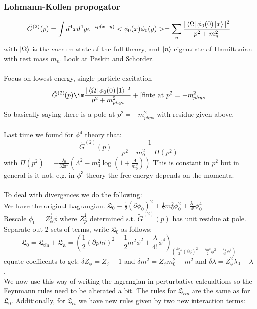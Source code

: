 \documentclass{article}
\begin{document}
\subsubsection{Lohmann-Kollen propogator}
$$
\tilde G^{(2)}(p) = \int d^4 x d^4 y e^{-ip(x-y)} < \phi_0 (x) \phi_0 (y)> = \sum_n \frac{|\bra{\Omega} \phi_0(0) \ket{x} |^2}{p^2 + m_n^2}
$$
with $\ket{\Omega}$ is the vaccum state of the full theory, and $\ket{n}$ eigenstate of Hamiltonian with rest mass $m_n$. Look at Peskin and Schorder. \\\\
Focus on lowest energy, single particle excitation\\
$$\tilde G^{(2)}(p) \im \frac{|\bra{\Omega} \phi_0(0) \ket{1} |^2}{p^2 + m^2_{phys}} + [\text{finte at } p^2 = - m^2_{phys}$$
So basically saying there is a pole at $p^2 = - m^2_{phys}$ with residue given above.\\\\
Last time we found for $\phi^4$ theory that:
$$
\tilde G^{(2)}(p) = \frac{1}{p^2 - m_0^2 - \Pi(p^2)}
$$
with $\Pi(p^2) = - \frac{\lambda_0}{32 \pi^2} ( \Lambda^2 - m_0^2 \log ( 1 + \frac{\Lambda}{m_0^2}))$
This is constant in $p^2$ but in general is it not. e.g. in $\phi^3$ theory the free energy depends on the momenta.\\\\
To deal with divergences we do the following:\\
We have the original Lagrangian: $\mathfrak{L}_0 = \frac{1}{2} (\partial \phi_0)^2 + \frac{1}{2} m_0^2 \phi_0^2 + \frac{\lambda_0}{4!} \phi_0^4$\\
Rescale $\phi_0 = Z_{\phi}^{\frac{1}{2}} \phi$ where $Z_p^{\frac{1}{2}}$ determined s.t. $\tilde G^{(2)} (p)$ has unit residue at pole.\\
Separate out 2 sets of terms, write $\mathfrak{L}_0$ as follows:
$$
\mathfrak{L}_0 = \mathfrak{L_{rln}} + \mathfrak{L_{ct}} = ( \frac{1}{2} (\partial phi)^2 + \frac{1}{2} m^2 \phi^2 + \frac{\lambda}{4!} \phi^4) _ ( \frac{\delta Z_{\phi}}{2} (\partial \phi)^2 + \frac{\delta m^2}{2} \phi^2 + \frac{\delta \lambda}{4!} \phi^4)
$$
equate coefficents to get: $\delta Z_{\phi} = Z_{\phi} - 1$ and $\delta m^2 = Z_{\phi} m_0^2 - m^2$ and $\delta \lambda = Z_{\phi}^2 \lambda_0 - \lambda$.\\
We now use this way of writing the lagrangian in perturbative calcualtions so the Feynmann rules need to be alterated a bit. The rules for $\mathfrak{L}_{rln}$ are the same as for $\mathfrak{L}_0$. Additionally, for $\mathfrak{L}_{ct}$ we have new rules given by two new interaction terms:
\end{document}

